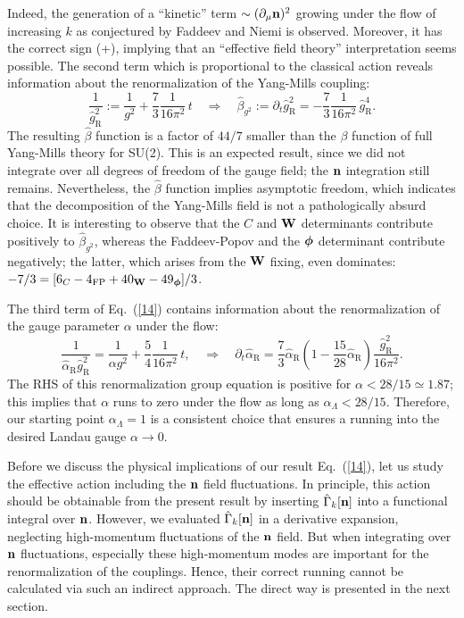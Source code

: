 \documentclass[a4paper,12pt]{article}
\newcommand{\re}[1]{~(\ref{#1})}
\begin{document}
Indeed, the generation of a ``kinetic'' term $\sim
(\partial_\mu\mathbf{n})^2$ growing under the flow of increasing $k$ as
conjectured by Faddeev and Niemi is observed. Moreover, it has the
correct sign (+), implying that an ``effective field theory''
interpretation seems possible. The second term which is proportional
to the classical action reveals information about the renormalization
of the Yang-Mills coupling:
\begin{equation}
\frac{1}{\hat{g}_{\text{R}}^2} := \frac{1}{g^2} + \frac{7}{3}
\frac{1}{16\pi^2} \, t\quad \Rightarrow\quad
\hat{\beta}_{g^2}:=\partial_t \hat{g}_{\text{R}}^2 =-\frac{7}{3}
\frac{1}{16\pi^2} \, \hat{g}_{\text{R}}^4. \label{15}
\end{equation}
The resulting $\hat{\beta}$ function is a factor of $44/7$ smaller
than the $\beta$ function of full Yang-Mills theory for SU(2). This is
an expected result, since we did not integrate over all degrees of
freedom of the gauge field; the $\mathbf{n}$ integration still remains.
Nevertheless, the $\hat{\beta}$ function implies asymptotic freedom, 
which indicates that the decomposition of the Yang-Mills field is not
a pathologically absurd choice. It is interesting to observe that the
$C$ and $\mathbf{W}$ determinants contribute positively to
$\hat{\beta}_{g^2}$, whereas the Faddeev-Popov and the $\boldsymbol{\phi}$
determinant contribute negatively; the latter, which arises from the
$\mathbf{W}$ fixing, even dominates: $-7/3=[6_C-4_{\text{FP}} +40_{\mathbf{W}}
-49_{\boldsymbol{\phi}}]/3$.

The third term of Eq.\re{14} contains information about the
renormalization of the gauge parameter $\alpha$ under the flow:
\begin{equation}
\frac{1}{\hat{\alpha}_{\text{R}} \hat{g}_{\text{R}}^2}
=\frac{1}{\alpha g^2} + \frac{5}{4} \frac{1}{16\pi^2}\,
t,\quad\Rightarrow\quad 
\partial_t \hat{\alpha}_{\text{R}} = \frac{7}{3}
\hat{\alpha}_{\text{R}} \left( 1- \frac{15}{28}
  \hat{\alpha}_{\text{R}}\right)
\frac{\hat{g}_{\text{R}}^2}{16\pi^2}. \label{16} 
\end{equation}
The RHS of this renormalization group equation is positive for
$\alpha<{28/15}\simeq1.87$; this implies that $\alpha$ runs
to zero under the flow as long as
$\alpha_\Lambda<{28/15}$. Therefore, our starting point
$\alpha_\Lambda=1$ is a consistent choice that ensures a running into
the desired Landau gauge $\alpha\to 0$. 

Before we discuss the physical implications of our result Eq.\re{14},
let us study the effective action including the $\mathbf{n}$ field
fluctuations. In principle, this action should be obtainable from the
present result by inserting $\hat{\Gamma}_k[\mathbf{n}]$ into a functional
integral over $\mathbf{n}$. However, we evaluated $\hat{\Gamma}_k[\mathbf{n}]$ in a
derivative expansion, neglecting high-momentum fluctuations of the
$\mathbf{n}$ field. But when integrating over $\mathbf{n}$ fluctuations, especially
these high-momentum modes are important for the renormalization of the
couplings. Hence, their correct running cannot be calculated via such
an indirect approach. The direct way is presented in the next section.
\end{document}

